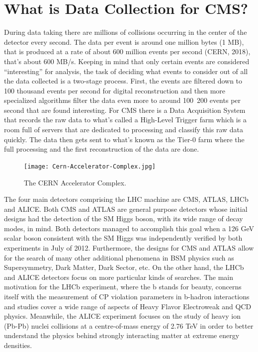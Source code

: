 \section{What is Data Collection for CMS?}

During data taking there are millions of collisions occurring in the center of the detector every second. The data per event is around one million bytes (1 MB), that is produced at a rate of about 600 million events per second (CERN, 2018), that’s about 600 MB/s. Keeping in mind that only certain events are considered “interesting” for analysis, the task of deciding what events to consider out of all the data collected is a two-stage process. First, the events are filtered down to 100 thousand events per second for digital reconstruction and then more specialized algorithms filter the data even more to around 100~200 events per second that are found interesting.
For CMS there is a Data Acquisition System that records the raw data to what’s called a High-Level Trigger farm which is a room full of servers that are dedicated to processing and classify this raw data quickly. The data then gets sent to what’s known as the Tier-0 farm where the full processing and the first reconstruction of the data are done. \cite{cmscomputing} 


\begin{figure}[tb]
\begin{center}
\texttt{[image: Cern-Accelerator-Complex.jpg]} 
\caption{The CERN Accelerator Complex\cite{LHCcomplex}.}
\label{Cern-Accelerator-Complex.jpg} 
\hspace{4em}
\end{center}
\end{figure}

The four main detectors comprising the LHC machine are CMS, ATLAS\cite{ATLAS}, LHCb\cite{LHCb} and ALICE\cite{ALICE}. Both CMS and ATLAS are general purpose detectors whose initial designs had the detection of the SM Higgs boson, with its wide range of decay modes, in mind. Both detectors managed to accomplish this goal when a 126 GeV scalar boson consistent with the SM Higgs was independently verified by both experiments in July of 2012. Furthermore, the designs for CMS and ATLAS allow for the search of many other additional phenomena in BSM physics such as Supersymmetry, Dark Matter\cite{DM}, Dark Sector\cite{DS}, etc. On the other hand, the LHCb and ALICE detectors focus on more particular kinds of searches. The main motivation for the LHCb experiment, where the b stands for beauty, concerns itself with the measurement of CP violation parameters in b-hadron interactions and studies cover a wide range of aspects of Heavy Flavor Electroweak and QCD physics. Meanwhile, the ALICE experiment focuses on the study of heavy ion (Pb-Pb) nuclei collisions at a centre-of-mass energy of 2.76 TeV in order to better understand the physics behind strongly interacting matter at extreme energy densities.

